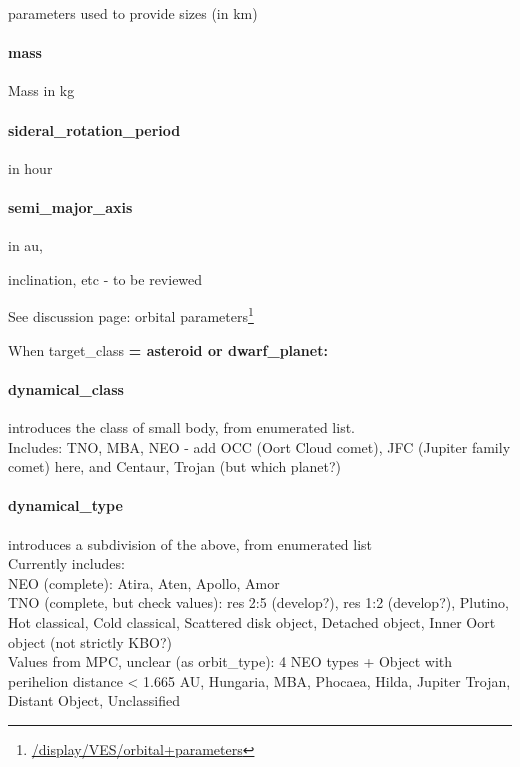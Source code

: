 \documentclass[11pt,a4paper]{ivoa}
\begin{document}
parameters used to provide sizes (in km)

\paragraph{mass}

Mass in kg

\paragraph{sideral\_rotation\_period}

in hour

\paragraph{semi\_major\_axis}

in au,

inclination, etc - to be reviewed

See discussion page: orbital parameters\footnote{\url{/display/VES/orbital+parameters}}

When target\_class\textbf{ = asteroid or dwarf\_planet:\\}

\paragraph{dynamical\_class}

introduces the class of small body, from enumerated list.\\Includes: TNO, MBA, NEO - add OCC (Oort Cloud comet), JFC (Jupiter family comet) here, and Centaur, Trojan (but which planet?)

\paragraph{\textbf{dynamical\_type}}

introduces a subdivision of the above, from enumerated list\\Currently includes: \\NEO (complete): Atira, Aten, Apollo, Amor\\TNO (complete, but check values): res 2:5 (develop?), res 1:2 (develop?), Plutino, Hot classical, Cold classical, Scattered disk object, Detached object, Inner Oort object (not strictly KBO?)\\Values from MPC, unclear (as orbit\_type): 4 NEO types + Object with perihelion distance < 1.665 AU, Hungaria, MBA, Phocaea, Hilda, Jupiter Trojan, Distant Object, Unclassified
\end{document}
